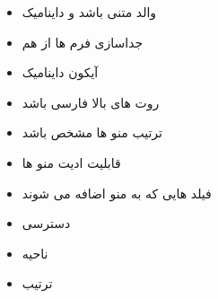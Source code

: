 \documentclass[12pt]{article}
\begin{document}
\begin{itemize}
	\item والد متنی باشد و داینامیک
	\item جداسازی فرم ها از هم
	\item آیکون داینامیک
	\item روت های بالا فارسی باشد
	\item ترتیب منو ها مشخص باشد
	\item قابلیت ادیت منو ها
	\item فیلد هایی که به منو اضافه می شوند
	\item دسترسی
	\item ناحیه
	\item ترتیب
\end{itemize}
\end{document}
